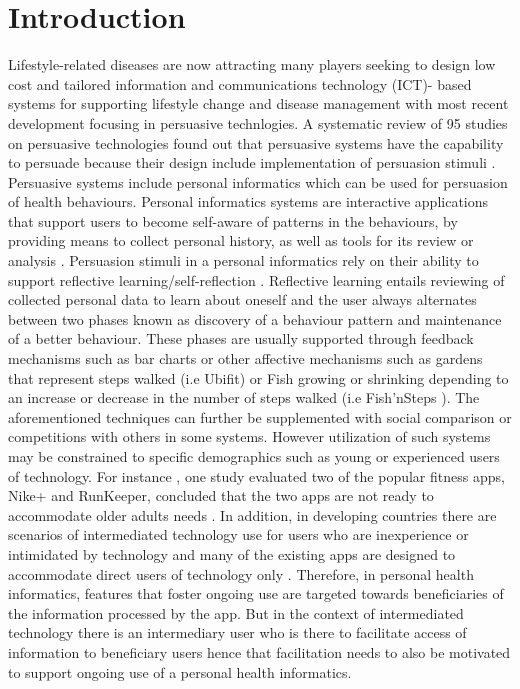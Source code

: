 \documentclass{sig-alternate}
\begin{document}
\section{Introduction} 
Lifestyle-related diseases are now attracting many players seeking to design low cost and tailored information and communications technology (ICT)- based systems for supporting lifestyle change and disease management\cite{arsand:mobile} with most recent development focusing in persuasive technlogies. A systematic review of 95 studies on persuasive technologies found out that persuasive systems have the capability to persuade because their design include implementation of persuasion stimuli \cite{hamari2014persuasive}.\newline
Persuasive systems include personal informatics which can be used for persuasion of health behaviours. Personal informatics systems are interactive applications that support users to become self-aware of patterns in the behaviours, by providing means to collect personal history, as well as tools for its review or analysis \cite{li2011:personal,li2012:personal}. Persuasion stimuli in a personal informatics rely on their ability to support reflective learning/self-reflection \cite{li2011:understanding}. Reflective learning entails reviewing of collected personal data to learn about oneself and the user always alternates between two phases known as discovery of a behaviour pattern and maintenance of a better behaviour\cite{li2011:understanding}. These phases are usually supported through feedback mechanisms such as bar charts or other affective mechanisms such as gardens that represent steps walked (i.e Ubifit\cite{klasnja2009:using}) or Fish growing or shrinking depending to an increase or decrease in the number of steps walked (i.e Fish'nSteps \cite{lin2006:fish}). The aforementioned techniques can further be supplemented with social comparison\cite{Oinas-kukkonen:psd} or competitions with others \cite{comber2013:designing} in some systems. \newline
However utilization of such systems may be constrained to specific demographics such as young or experienced users of technology. For instance , one study evaluated two of the popular fitness apps, Nike+ and RunKeeper, concluded that the two apps are not ready to accommodate older adults needs \cite{silva2014:smartphones}. In addition, in developing countries there are scenarios of intermediated technology use for users who are inexperience or intimidated by technology and many of the existing apps are designed to accommodate direct users of technology only \cite{sambasivan2010}. Therefore, in personal health informatics, features that foster ongoing use are targeted towards beneficiaries of the information processed by the app. But in the context of intermediated technology there is an intermediary user who is there to facilitate access of information to beneficiary users hence that facilitation needs to also be motivated to support ongoing use of a personal health informatics.\newline
\end{document}
